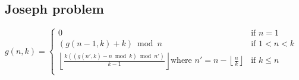 \vspace{-3pt}\subsection{Joseph problem}\vspace{-3pt}
${\displaystyle g(n,k)={\begin{cases}
 0 & {\text{if }}n=1\\
 (g(n-1,k)+k){\bmod {n}}&{\text{if }} 1<n<k\\
 \left\lfloor {\frac {k((g(n',k)-n{\bmod {k}}){\bmod {n}}')}{k-1}}\right\rfloor {\text{where }}n'=n-\left\lfloor {\frac {n}{k}}\right\rfloor &{\text{if }}k\leq n\\
 \end{cases}}}$\\
\hrulefill